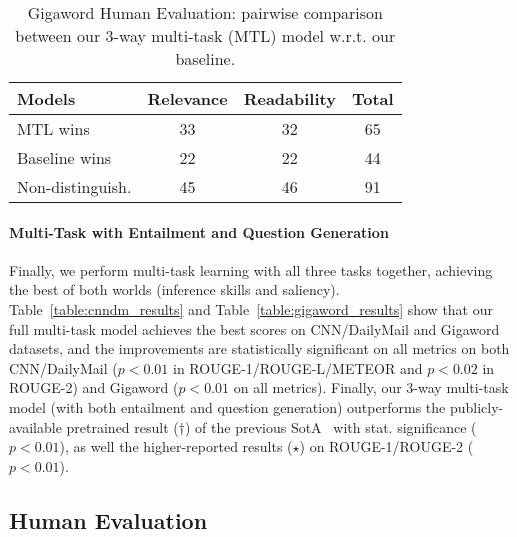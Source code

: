 \documentclass[11pt,a4paper]{article}
\begin{document}
\begin{table}[t]
\begin{small}
\begin{center}
\begin{tabular}{|l|c|c|c|}
\hline
Models & Relevance & Readability & Total \\
\hline
MTL wins & 33 & 32 & 65\\
Baseline wins & 22 & 22 & 44 \\
Non-distinguish. & 45 & 46 & 91 \\
\hline
\end{tabular}
\end{center}
\vspace{-10pt}
\caption{Gigaword Human Evaluation: pairwise comparison between our 3-way multi-task (MTL) model w.r.t. our baseline.
}
\label{table:human-eval-results_gigaword}
\vspace{-7pt}
\end{small}
\end{table}


\paragraph{Multi-Task with Entailment and Question Generation}
Finally, we perform multi-task learning with all three tasks together, achieving the best of both worlds (inference skills and saliency). Table~\ref{table:cnndm_results} and Table~\ref{table:gigaword_results} show that our full multi-task model achieves the best scores on CNN/DailyMail and Gigaword datasets, and the improvements are statistically significant on all metrics on both CNN/DailyMail ($p<0.01$ in ROUGE-1/ROUGE-L/METEOR and $p<0.02$ in ROUGE-2) and Gigaword ($p<0.01$ on all metrics). 
Finally, our 3-way multi-task model (with both entailment and question generation) outperforms the publicly-available pretrained result ($\dagger$) of the previous SotA~\cite{see2017get} with stat. significance ($p<0.01$), as well the higher-reported results ($\star$) on ROUGE-1/ROUGE-2 ($p<0.01$).



\subsection{Human Evaluation}
\label{subsec:human-evaluation}
\end{document}
